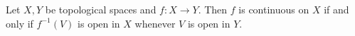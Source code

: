 Let $X, Y$ be topological spaces and $f: X \to Y$. Then $f$ is continuous on $X$ if and only if $f^{-1}(V)$ is open in $X$ whenever $V$ is open in $Y$.